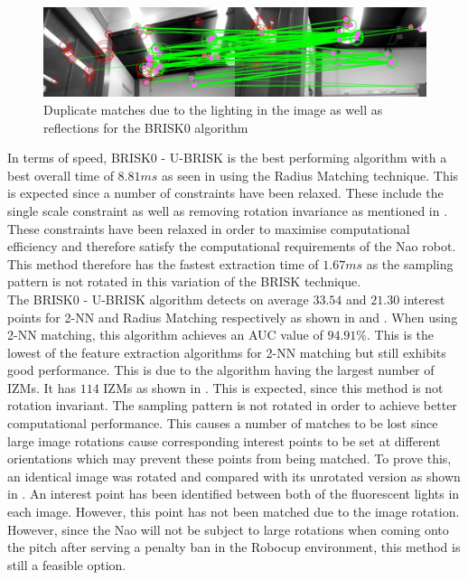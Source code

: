 \documentclass[11pt]{report}
\begin{document}
\begin{figure}
  \centering
    \includegraphics[width=1.0\textwidth]{../Drawings/problems/Reflections.jpg}
    \caption{Duplicate matches due to the lighting in the image as well as reflections for the BRISK0 algorithm} 
    \label{fig:duplicateMatchesBrisk4}
\end{figure}



In terms of speed, BRISK0 - U-BRISK is the best performing algorithm with a best overall time of $8.81 ms$ as seen in  using the Radius Matching technique.  This is expected since a number of constraints have been relaxed. These include the single scale constraint as well as removing rotation invariance as mentioned in . These constraints have been relaxed in order to maximise computational efficiency and therefore satisfy the computational requirements of the Nao robot. This method therefore has the fastest extraction time of $1.67 ms$ as the sampling pattern is not rotated in this variation of the BRISK technique. \\

The BRISK0 - U-BRISK algorithm detects on average $33.54$ and $21.30$ interest points for 2-NN and Radius Matching respectively as shown in  and . When using 2-NN matching, this algorithm achieves an AUC value of $94.91\%$. This is the lowest of the feature extraction algorithms for 2-NN matching but still exhibits good performance. This is due to the algorithm having the largest number of IZMs. It has $114$ IZMs as shown in . This is expected, since this method is not rotation invariant. The sampling pattern is not rotated in order to achieve better computational performance. This causes a number of matches to be lost since large image rotations cause corresponding interest points to be set at different orientations which may prevent these points from being matched. To prove this, an identical image was rotated and compared with its unrotated version as shown in . An interest point has been identified between both of the fluorescent lights in each image. However, this point has not been matched due to the image rotation. However, since the Nao will not be subject to large rotations when coming onto the pitch after serving a penalty ban in the Robocup environment, this method is still a feasible option. \\
\end{document}
